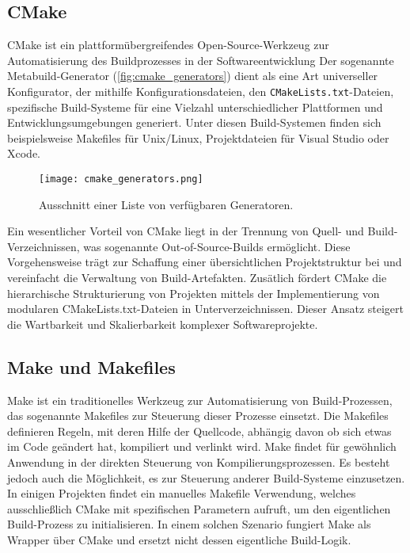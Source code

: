 \subsection*{CMake}
CMake ist ein plattformübergreifendes Open-Source-Werkzeug zur Automatisierung des Buildprozesses in der Softwareentwicklung
Der sogenannte Metabuild-Generator (\autoref{fig:cmake_generators}) dient als eine Art universeller Konfigurator, der mithilfe Konfigurationsdateien, den \texttt{CMakeLists.txt}-Dateien, spezifische Build-Systeme für eine Vielzahl unterschiedlicher Plattformen und Entwicklungsumgebungen generiert.
Unter diesen Build-Systemen finden sich beispielsweise Makefiles für Unix/Linux, Projektdateien für Visual Studio oder Xcode.

\begin{figure}[H]
	\texttt{[image: cmake\_generators.png]}
	\caption{Ausschnitt einer Liste von verfügbaren Generatoren.}
	\label{fig:cmake_generators}
\end{figure}

Ein wesentlicher Vorteil von CMake liegt in der Trennung von Quell- und Build-Verzeichnissen, was sogenannte Out-of-Source-Builds ermöglicht.
Diese Vorgehensweise trägt zur Schaffung einer übersichtlichen Projektstruktur bei und vereinfacht die Verwaltung von Build-Artefakten.
Zusätlich fördert CMake die hierarchische Strukturierung von Projekten mittels der Implementierung von modularen CMakeLists.txt-Dateien in Unterverzeichnissen.
Dieser Ansatz steigert die Wartbarkeit und Skalierbarkeit komplexer Softwareprojekte.

\subsection*{Make und Makefiles}
Make ist ein traditionelles Werkzeug zur Automatisierung von Build-Prozessen, das sogenannte Makefiles zur Steuerung dieser Prozesse einsetzt.
Die Makefiles definieren Regeln, mit deren Hilfe der Quellcode, abhängig davon ob sich etwas im Code geändert hat, kompiliert und verlinkt wird.
Make findet für gewöhnlich Anwendung in der direkten Steuerung von Kompilierungsprozessen.
 Es besteht jedoch auch die Möglichkeit, es zur Steuerung anderer Build-Systeme einzusetzen.
In einigen Projekten findet ein manuelles Makefile Verwendung, welches ausschließlich CMake mit spezifischen Parametern aufruft, um den eigentlichen Build-Prozess zu initialisieren.
In einem solchen Szenario fungiert Make als Wrapper über CMake und ersetzt nicht dessen eigentliche Build-Logik.


